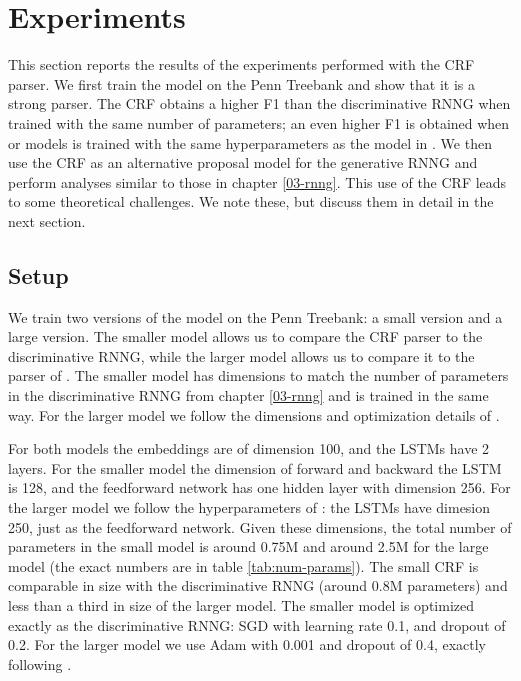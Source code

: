 \section{Experiments}
  This section reports the results of the experiments performed with the CRF parser. We first train the model on the Penn Treebank and show that it is a strong parser. The CRF obtains a higher F1 than the discriminative RNNG when trained with the same number of parameters; an even higher F1 is obtained when or models is trained with the same hyperparameters as the model in \citet{stern2017minimal}. We then use the CRF as an alternative proposal model for the generative RNNG and perform analyses similar to those in chapter \ref{03-rnng}. This use of the CRF leads to some theoretical challenges. We note these, but discuss them in detail in the next section.

  \subsection{Setup}
    We train two versions of the model on the Penn Treebank: a small version and a large version. The smaller model allows us to compare the CRF parser to the discriminative RNNG, while the larger model allows us to compare it to the parser of \citet{stern2017minimal}. The smaller model has dimensions to match the number of parameters in the discriminative RNNG from chapter \ref{03-rnng} and is trained in the same way. For the larger model we follow the dimensions and optimization details of \citet{stern2017minimal}.

    For both models the embeddings are of dimension 100, and the LSTMs have 2 layers. For the smaller model the dimension of forward and backward the LSTM is 128, and the feedforward network has one hidden layer with dimension 256. For the larger model we follow the hyperparameters of \citet{stern2017minimal}: the LSTMs have dimesion 250, just as the feedforward network. Given these dimensions, the total number of parameters in the small model is around 0.75M and around 2.5M for the large model (the exact numbers are in table \ref{tab:num-params}). The small CRF is comparable in size with the discriminative RNNG (around 0.8M parameters) and less than a third in size of the larger model. The smaller model is optimized exactly as the discriminative RNNG: SGD with learning rate 0.1, and dropout of 0.2. For the larger model we use Adam \citep{kingma2014adam} with 0.001 and dropout of 0.4, exactly following \citet{stern2017minimal}.

